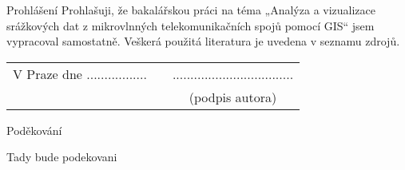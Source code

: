 \newcommand{\odsaditodzhora}{\hskip1pt\vfill}

\odsaditodzhora
\noindent Prohlášení
Prohlašuji, že bakalářskou práci na téma „Analýza a vizualizace srážkových dat z mikrovlnných telekomunikačních spojů pomocí GIS“ jsem vypracoval samostatně. Veškerá použitá literatura je uvedena v seznamu zdrojů.

\begin{flushleft}
\begin{tabular}{cp{}c}
V Praze dne .................
& 
&
..................................
\\
&&
(podpis autora)
\end{tabular}

\end{flushleft}
\newpage

\odsaditodzhora
\noindent Poděkování

Tady bude podekovani

\newpage
